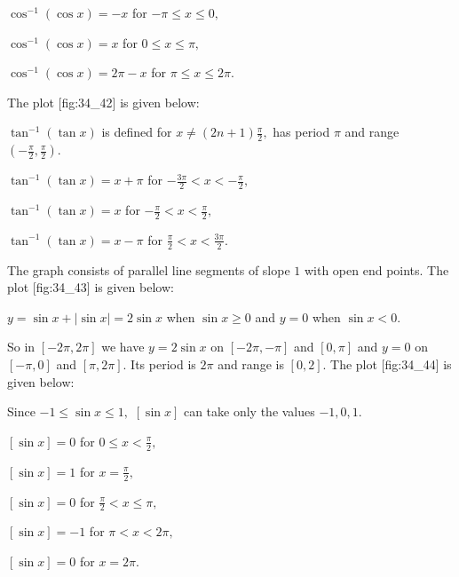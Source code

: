   $\cos^{-1}(\cos x) = -x$ for $-\pi\leq x\leq 0,$

  $\cos^{-1}(\cos x) = x$ for $0\leq x\leq \pi,$

  $\cos^{-1}(\cos x) = 2\pi - x$ for $\pi\leq x\leq 2\pi.$

  The plot [fig:34_42] is given below:

  \startplacefigure[title={Plot of $\cos^{-1}(\cos x)$}, reference=fig:34_42]
    \externalfigure[34_42.pdf]
  \stopplacefigure

\item $\tan^{-1}(\tan x)$ is defined for $x\neq(2n + 1)\frac{\pi}{2},$ has period $\pi$ and range $\left(-\frac{\pi}{2},
  \frac{\pi}{2}\right).$

  $\tan^{-1}(\tan x) = x + \pi$ for $-\frac{3\pi}{2} < x < -\frac{\pi}{2},$

  $\tan^{-1}(\tan x) = x$ for $-\frac{\pi}{2} < x < \frac{\pi}{2},$

  $\tan^{-1}(\tan x) = x - \pi$ for $\frac{\pi}{2} < x < \frac{3\pi}{2}.$

  The graph consists of parallel line segments of slope $1$ with open end points. The plot [fig:34_43] is
  given below:

  \startplacefigure[title={Plot of $\tan^{-1}(\tan x)$}, reference=fig:34_43]
    \externalfigure[34_43.pdf]
  \stopplacefigure

\item $y = \sin x + |\sin x| = 2\sin x$ when $\sin x\geq 0$ and $y = 0$ when $\sin x < 0.$

  So in $[-2\pi, 2\pi]$ we have $y = 2\sin x$ on $[-2\pi, -\pi]$ and $[0, \pi]$ and $y = 0$ on $[-\pi, 0]$ and $[\pi,
  2\pi].$ Its period is $2\pi$ and range is $[0, 2].$ The plot [fig:34_44] is given below:

  \startplacefigure[title={Plot of $\sin x + |\sin x|$}, reference=fig:34_44]
    \externalfigure[34_44.pdf]
  \stopplacefigure

\item Since $-1\leq\sin x\leq 1,$ $[\sin x]$ can take only the values $-1, 0, 1.$

  $[\sin x] = 0$ for $0\leq x < \frac{\pi}{2},$

  $[\sin x] = 1$ for $x = \frac{\pi}{2},$

  $[\sin x] = 0$ for $\frac{\pi}{2} < x\leq\pi,$

  $[\sin x] = -1$ for $\pi < x < 2\pi,$

  $[\sin x] = 0$ for $x = 2\pi.$

